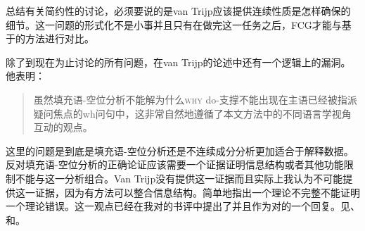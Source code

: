 总结有关简约性的讨论，必须要说的是van Trijp应该提供连续性质是怎样确保的细节。这一问题的形式化不是小事并且只有在做完这一任务之后，FCG才能与基于\slaschc 的方法进行对比。

除了到现在为止讨论的所有问题，在van Trijp的论述中还有一个逻辑上的漏洞。他表明：
\begin{quote}
虽然填充语-空位分析不能解为什么\textsc{why} do-支撑不能出现在主语已经被指派疑问焦点的wh问句中，这非常自然地遵循了本文方法中的不同语言学视角互动的观点。\citep[]{vanTrijp2014a}
\end{quote}
这里的问题是到底是填充语-空位分析还是不连续成分分析更加适合于解释数据。反对填充语-空位分析的正确论证应该需要一个证据证明信息结构或者其他功能限制不能与这一分析组合。Van Trijp没有提供这一证据而且实际上我认为不可能提供这一证据，因为有方法可以整合信息结构。简单地指出一个理论不完整不能证明一个理论错误。这一观点已经在我对的书评中提出了并且作为对\citet{Boas2014a}的一个回复。见、和。

